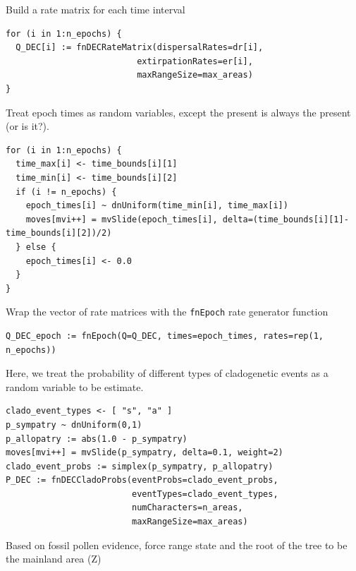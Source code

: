 Build a rate matrix for each time interval
\begin{snugshade}
\begin{lstlisting}
for (i in 1:n_epochs) {
  Q_DEC[i] := fnDECRateMatrix(dispersalRates=dr[i],
                          extirpationRates=er[i],
                          maxRangeSize=max_areas)
}
\end{lstlisting}
\end{snugshade}


Treat epoch times as random variables, except the present is always the present (or is it?).

\begin{snugshade}
\begin{lstlisting}
for (i in 1:n_epochs) {
  time_max[i] <- time_bounds[i][1]
  time_min[i] <- time_bounds[i][2]
  if (i != n_epochs) {
    epoch_times[i] ~ dnUniform(time_min[i], time_max[i])
    moves[mvi++] = mvSlide(epoch_times[i], delta=(time_bounds[i][1]-time_bounds[i][2])/2)
  } else {
    epoch_times[i] <- 0.0
  }
}
\end{lstlisting}
\end{snugshade}

Wrap the vector of rate matrices with the {\tt fnEpoch} rate generator function

\begin{snugshade}
\begin{lstlisting}
Q_DEC_epoch := fnEpoch(Q=Q_DEC, times=epoch_times, rates=rep(1, n_epochs))
\end{lstlisting}
\end{snugshade}


Here, we treat the probability of different types of cladogenetic events as a random variable to be estimate.

\begin{snugshade}
\begin{lstlisting}
clado_event_types <- [ "s", "a" ]
p_sympatry ~ dnUniform(0,1)
p_allopatry := abs(1.0 - p_sympatry)
moves[mvi++] = mvSlide(p_sympatry, delta=0.1, weight=2)
clado_event_probs := simplex(p_sympatry, p_allopatry)
P_DEC := fnDECCladoProbs(eventProbs=clado_event_probs,
                         eventTypes=clado_event_types,
                         numCharacters=n_areas,
                         maxRangeSize=max_areas)
\end{lstlisting}
\end{snugshade}

Based on fossil pollen evidence, force range state and the root of the tree to be the mainland area (Z)

